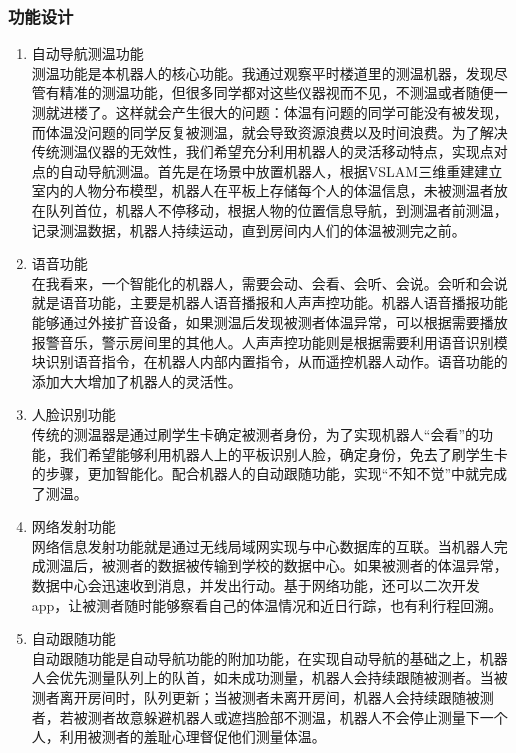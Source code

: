 \documentclass[11pt]{article}
\begin{document}
\subsubsection{功能设计}
\begin{enumerate}
    \item 自动导航测温功能\\
    测温功能是本机器人的核心功能。我通过观察平时楼道里的测温机器，发现尽管有精准的测温功能，但很多同学都对这些仪器视而不见，不测温或者随便一测就进楼了。这样就会产生很大的问题：体温有问题的同学可能没有被发现，而体温没问题的同学反复被测温，就会导致资源浪费以及时间浪费。为了解决传统测温仪器的无效性，我们希望充分利用机器人的灵活移动特点，实现点对点的自动导航测温。首先是在场景中放置机器人，根据VSLAM三维重建建立室内的人物分布模型，机器人在平板上存储每个人的体温信息，未被测温者放在队列首位，机器人不停移动，根据人物的位置信息导航，到测温者前测温，记录测温数据，机器人持续运动，直到房间内人们的体温被测完之前。
    \item 语音功能\\
    在我看来，一个智能化的机器人，需要会动、会看、会听、会说。会听和会说就是语音功能，主要是机器人语音播报和人声声控功能。机器人语音播报功能能够通过外接扩音设备，如果测温后发现被测者体温异常，可以根据需要播放报警音乐，警示房间里的其他人。人声声控功能则是根据需要利用语音识别模块识别语音指令，在机器人内部内置指令，从而遥控机器人动作。语音功能的添加大大增加了机器人的灵活性。
    \item 人脸识别功能\\
    传统的测温器是通过刷学生卡确定被测者身份，为了实现机器人“会看”的功能，我们希望能够利用机器人上的平板识别人脸，确定身份，免去了刷学生卡的步骤，更加智能化。配合机器人的自动跟随功能，实现“不知不觉”中就完成了测温。
    \item 网络发射功能\\
    网络信息发射功能就是通过无线局域网实现与中心数据库的互联。当机器人完成测温后，被测者的数据被传输到学校的数据中心。如果被测者的体温异常，数据中心会迅速收到消息，并发出行动。基于网络功能，还可以二次开发app，让被测者随时能够察看自己的体温情况和近日行踪，也有利行程回溯。
    \item 自动跟随功能\\
    自动跟随功能是自动导航功能的附加功能，在实现自动导航的基础之上，机器人会优先测量队列上的队首，如未成功测量，机器人会持续跟随被测者。当被测者离开房间时，队列更新；当被测者未离开房间，机器人会持续跟随被测者，若被测者故意躲避机器人或遮挡脸部不测温，机器人不会停止测量下一个人，利用被测者的羞耻心理督促他们测量体温。
\end{enumerate}
\end{document}
